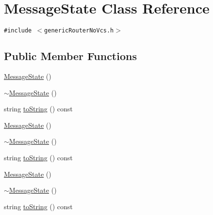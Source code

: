 \hypertarget{classMessageState}{
\section{MessageState Class Reference}
\label{classMessageState}
}
{\tt \#include $<$genericRouterNoVcs.h$>$}

\subsection*{Public Member Functions}
\begin{CompactItemize}
\item 
\hyperlink{classMessageState_ad9003377a5ab63ece9eedd35bae105e}{MessageState} ()
\item 
\hyperlink{classMessageState_5ad0eb922535da32b91d990e64843ec2}{$\sim$MessageState} ()
\item 
string \hyperlink{classMessageState_16ae858ec7ab2042f10cb92f1f4dbd7a}{toString} () const 
\item 
\hyperlink{classMessageState_ad9003377a5ab63ece9eedd35bae105e}{MessageState} ()
\item 
\hyperlink{classMessageState_5ad0eb922535da32b91d990e64843ec2}{$\sim$MessageState} ()
\item 
string \hyperlink{classMessageState_16ae858ec7ab2042f10cb92f1f4dbd7a}{toString} () const 
\item 
\hyperlink{classMessageState_ad9003377a5ab63ece9eedd35bae105e}{MessageState} ()
\item 
\hyperlink{classMessageState_5ad0eb922535da32b91d990e64843ec2}{$\sim$MessageState} ()
\item 
string \hyperlink{classMessageState_16ae858ec7ab2042f10cb92f1f4dbd7a}{toString} () const 
\end{CompactItemize}
